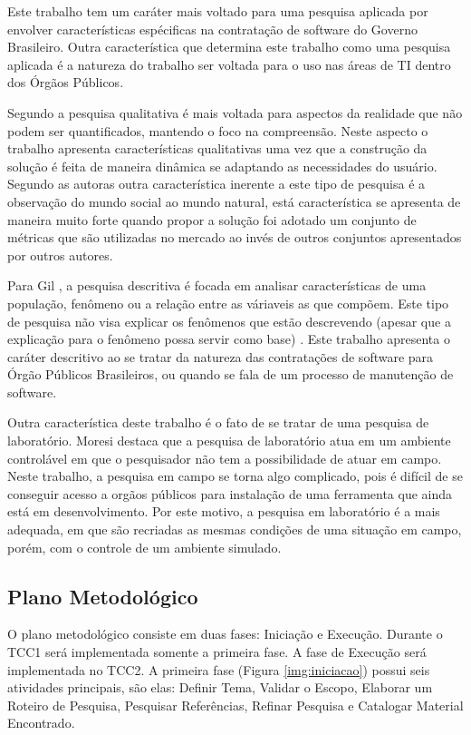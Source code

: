 Este trabalho tem um caráter mais voltado para uma pesquisa aplicada por envolver características espécificas na contratação de software do Governo Brasileiro. Outra característica que determina este trabalho como uma pesquisa aplicada é a natureza do trabalho ser voltada para o uso nas áreas de TI dentro dos Órgãos Públicos.

Segundo \cite{tatiana_denise} a pesquisa qualitativa é mais voltada para aspectos da realidade que não podem ser quantificados, mantendo o foco na compreensão. Neste aspecto o trabalho apresenta características qualitativas uma vez que a construção da solução é feita de maneira dinâmica se adaptando as necessidades do usuário. Segundo as autoras outra característica inerente a este tipo de pesquisa é a observação do mundo social ao mundo natural, está característica se apresenta de maneira muito forte quando propor a solução foi adotado um conjunto de métricas que são utilizadas no mercado ao invés de outros conjuntos apresentados por outros autores. 

Para Gil \cite{gil_como_2002}, a pesquisa descritiva é focada em analisar características de uma população, fenômeno ou a relação entre as váriaveis as que compõem. Este tipo de pesquisa não visa explicar os fenômenos que estão descrevendo (apesar que a explicação para o fenômeno possa servir como base) \cite{moresi_metodologia_2003}. Este trabalho apresenta o caráter descritivo ao se tratar da natureza das contratações de software para Órgão Públicos Brasileiros, ou quando se fala de um processo de manutenção de software.

Outra característica deste trabalho é o fato de se tratar de uma pesquisa de laboratório. Moresi destaca que a pesquisa de laboratório atua em um ambiente controlável em que o pesquisador não tem a possibilidade de atuar em campo. Neste trabalho, a pesquisa em campo se torna algo complicado, pois é difícil de se conseguir acesso a orgãos públicos para instalação de uma ferramenta que ainda está em desenvolvimento. Por este motivo, a pesquisa em laboratório é a mais adequada, em que são recriadas as mesmas condições de uma situação em campo, porém, com o controle de um ambiente simulado.

\subsection{Plano Metodológico}
\label{plano_metodologico}
O plano metodológico consiste em duas fases: Iniciação e Execução. Durante o TCC1 será implementada somente a primeira fase. A fase de Execução será implementada no TCC2. A primeira fase (Figura \ref{img:iniciacao}) possui seis atividades principais, são elas: Definir Tema, Validar o Escopo, Elaborar um Roteiro de Pesquisa, Pesquisar Referências, Refinar Pesquisa e Catalogar Material Encontrado.

